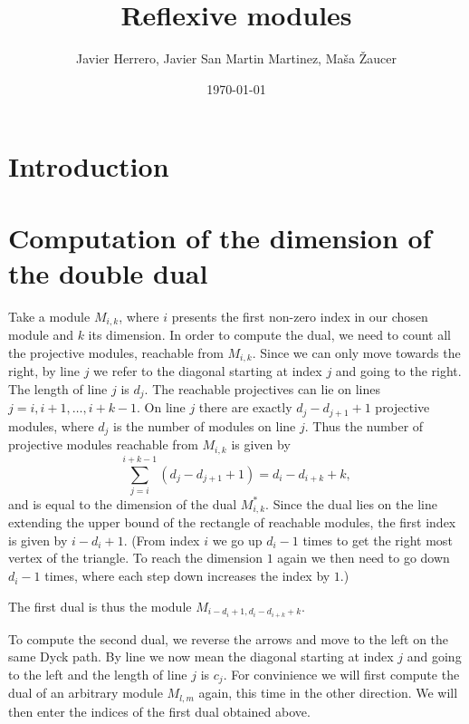 \documentclass[12pt, a4paper]{article}
\title{Reflexive modules}
\author{Javier Herrero, Javier San Martin Martinez, Maša Žaucer}
\date{\today}
\begin{document}
\maketitle


\begin{abstract}
\end{abstract}

\section{Introduction}

\section{Computation of the dimension of the double dual}
Take a module $M_{i,k}$, where $i$ presents the first non-zero index in our chosen module and $k$ its dimension. 
In order to compute the dual, we need to count all the projective modules, reachable from $M_{i,k}$. 
Since we can only move towards the right, by line $j$ we refer to the diagonal starting at index $j$ and going to the right. The length of line $j$ is $d_j$.
The reachable projectives can lie on lines $j = i, i+1, \dots, i+k-1$.
On line $j$ there are exactly $d_j - d_{j+1} + 1$ projective modules, where $d_j$ is the number of modules on line $j$.
Thus the number of projective modules reachable from $M_{i,k}$ is given by
\begin{equation}
\label{eq:reachable}
\sum_{j=i}^{i+k-1} (d_j - d_{j+1} + 1) = d_i - d_{i+k} + k,
\end{equation}
and is equal to the dimension of the dual $M^*_{i,k}$.
Since the dual lies on the line extending the upper bound of the rectangle of reachable modules, the first index is given by $i - d_i + 1$.
(From index $i$ we go up $d_i - 1$ times to get the right most vertex of the triangle. To reach the dimension $1$ again we then need to go down $d_i - 1$ times, where each step down increases the index by $1$.)

The first dual is thus the module $M_{i - d_i + 1, d_i - d_{i+k} + k}$.

To compute the second dual, we reverse the arrows and move to the left on the same Dyck path. By line we now mean the diagonal starting at index $j$ and going to the left and the length of line $j$ is $c_j$.
For convinience we will first compute the dual of an arbitrary module $M_{l,m}$ again, this time in the other direction. We will then enter the indices of the first dual obtained above.
\end{document}

